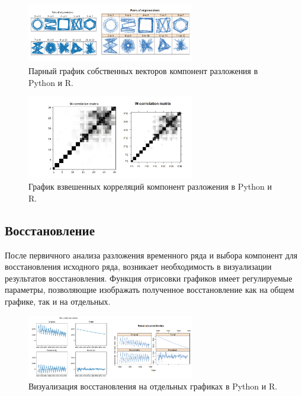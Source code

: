 \documentclass[specialist,
			   substylefile = spbu_report.rtx,
			   subf,href,colorlinks=true, 12pt]{disser}
\begin{document}
\begin{figure}[htp]
	\centering
	\includegraphics[width=0.65\textwidth]{rpy_pairs}
	\caption{Парный график собственных векторов компонент разложения в Python и R.}
	\label{fig:rpy_pairs}
\end{figure}

\begin{figure}[htp]
	\centering
	\includegraphics[width=0.65\textwidth]{rpy_wcor}
	\caption{График взвешенных корреляций компонент разложения в Python и R.}
	\label{fig:rpy_wcor}
\end{figure}

\subsection{Восстановление}

После первичного анализа разложения временного ряда и выбора компонент для восстановления исходного ряда, возникает необходимость в визуализации результатов восстановления. Функция отрисовки графиков имеет регулируемые параметры, позволяющие изображать полученное восстановление как на общем графике, так и на отдельных.

\begin{figure}[htp]
	\centering
	\includegraphics[width=0.65\textwidth]{rpy_rec}
	\caption{Визуализация восстановления на отдельных графиках в Python и R.}
	\label{fig:rpy_rec}
\end{figure}
\end{document}
